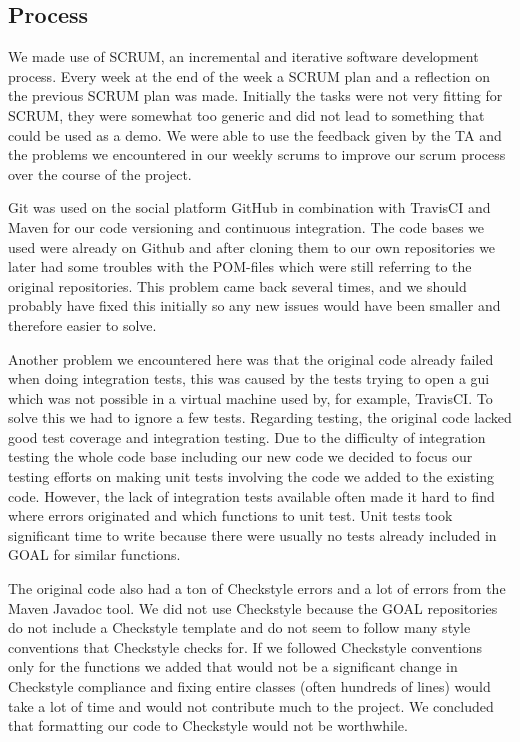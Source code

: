 \documentclass[11pt]{article}
\begin{document}
\subsection{Process}
We made use of \gls{SCRUM}, an incremental and iterative software development process. Every week at the end of the week a SCRUM plan and a reflection on the previous SCRUM plan was made. Initially the tasks were not very fitting for SCRUM, they were somewhat too generic and did not lead to something that could be used as a demo. We were able to use the feedback given by the TA and the problems we encountered in our weekly scrums to improve our scrum process over the course of the project. \par 
Git\cite{git} was used on the social platform GitHub\cite{GitHub} in combination with \gls{TravisCI}\cite{TravisCI} and Maven\cite{Maven} for our code versioning and continuous integration. The code bases we used were already on Github and after cloning them to our own repositories we later had some troubles with the POM-files which were still referring to the original repositories. This problem came back several times, and we should probably have fixed this initially so any new issues would have been smaller and therefore easier to solve. \par 
Another problem we encountered here was that the original code already failed when doing integration tests, this was caused by the tests trying to open a gui which was not possible in a virtual machine used by, for example, TravisCI. To solve this we had to ignore a few tests. Regarding testing, the original code lacked good test coverage and integration testing. Due to the difficulty of integration testing the whole code base including our new code we decided to focus our testing efforts on making unit tests involving the code we added to the existing code. However, the lack of integration tests available often made it hard to find where errors originated and which functions to unit test. Unit tests took significant time to write because there were usually no tests already included in GOAL for similar functions. \par 
The original code also had a ton of Checkstyle errors and a lot of errors from the Maven Javadoc tool. We did not use Checkstyle because the GOAL repositories do not include a Checkstyle template and do not seem to follow many style conventions that Checkstyle checks for. If we followed Checkstyle conventions only for the functions we added that would not be a significant change in Checkstyle compliance and fixing entire classes (often hundreds of lines) would take a lot of time and would not contribute much to the project. We concluded that formatting our code to Checkstyle would not be worthwhile.\\
\end{document}
